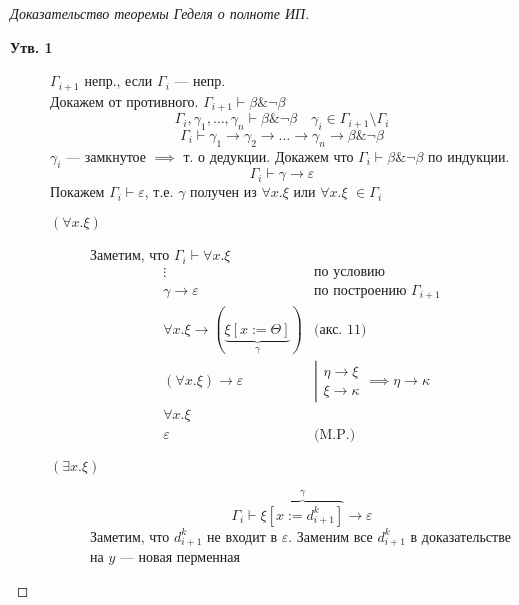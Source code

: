 \documentclass[oneside]{book}
\begin{document}
\begin{proof}[Доказательство теоремы Геделя о полноте ИП]
	\begin{description}
		\item[{\textbf{Утв. 1}}] \(\Gamma_{i + 1}\) непр., если \(\Gamma_i\) --- непр. \\
			Докажем от противного. \(\Gamma_{i + 1} \vdash \beta \& \neg \beta\)
			\[ \Gamma_i, \gamma_1, \dots, \gamma_n \vdash \beta \& \neg \beta \quad \gamma_i \in \Gamma_{i + 1} \setminus \Gamma_i \]
			\[ \Gamma_i \vdash \gamma_1 \to \gamma_2 \to \dots \to \gamma_n \to \beta \& \neg \beta \]
			\(\gamma_i\) --- замкнутое \(\implies\) т. о дедукции. Докажем что \(\Gamma_i \vdash \beta \& \neg \beta\) по индукции.
			\[ \Gamma_i \vdash \gamma \to \varepsilon \]
			Покажем \(\Gamma_i \vdash \varepsilon\), т.е. \(\gamma\) получен из \(\forall x. \xi\) или \(\forall x. \xi\) \(\in \Gamma_i\)
			\begin{description}
				\item[{\textbf{\((\forall x. \xi)\)}}] Заметим, что \(\Gamma_i \vdash \forall x.\xi\)
					\[ \begin{array}{ll}
							\vdots                                                 & \text{по условию}                                                                                \\
							\gamma \to \varepsilon                                 & \text{по построению }\Gamma_{i + 1}                                                              \\
							\forall x.\xi \to (\underbrace{\xi[x:=\Theta]}_\gamma) & \text{(акс. 11)}                                                                                 \\
							(\forall x.\xi) \to \varepsilon                        & \left|\begin{matrix} \eta \to \xi \\ \xi \to \kappa \end{matrix}\right. \implies \eta \to \kappa \\
							\forall x.\xi                                          &                                                                                                  \\
							\varepsilon                                            & \text{(M.P.)}
						\end{array} \]
				\item[{\textbf{\((\exists x. \xi)\)}}] \[ \Gamma_i \vdash \overbrace{\xi[x:=d^k_{i + 1}]}^\gamma \to \varepsilon \]
					Заметим, что \(d^k_{i + 1}\) не входит в \(\varepsilon\). Заменим все \(d^k_{i + 1}\) в доказательстве на \(y\) --- новая перменная

\end{description}
\end{description}
\end{proof}
\end{document}
